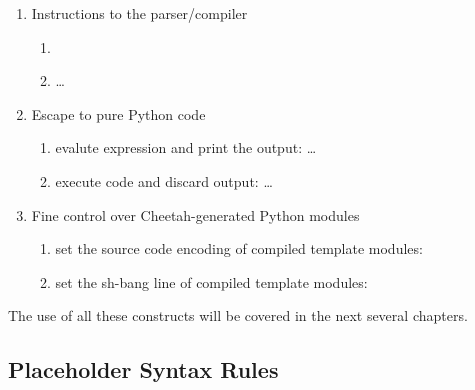 \begin{enumerate}
\item Instructions to the parser/compiler
     \begin{enumerate}
     \item {}
     \item {} \ldots {}
     \end{enumerate}

\item Escape to pure Python code
    \begin{enumerate}
    \item evalute expression and print the output: \code{<\%=} \ldots
      \code{\%>} 
    \item execute code and discard output: \code{<\%} \ldots \code{\%>}
    \end{enumerate}

\item Fine control over Cheetah-generated Python modules
     \begin{enumerate}
     \item set the source code encoding of compiled template modules: 
     \item set the sh-bang line of compiled template modules: 
     \end{enumerate}

\end{enumerate}

The use of all these constructs will be covered in the next several chapters.



\subsection{Placeholder Syntax Rules}
\label{language.placeholders.syntax}

